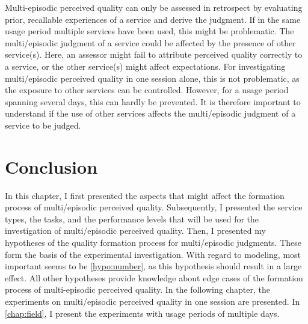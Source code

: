 Multi-episodic perceived quality can only be assessed in retrospect by evaluating prior, recallable experiences of a service and derive the judgment.
If in the same usage period multiple services have been used, this might be problematic.
The multi\-/episodic judgment of a service could be affected by the presence of other service(s).
Here, an assessor might fail to attribute perceived quality correctly to a service, or the other service(s) might affect expectations.
For investigating multi\-/episodic perceived quality in one session alone, this is not problematic, as the exposure to other services can be controlled.
However, for a usage period spanning several days, this can hardly be prevented.
It is therefore important to understand if the use of other services affects the multi\-/episodic judgment of a service to be judged.

\section{Conclusion}
In this chapter, I first presented the aspects that might affect the formation process of multi\-/episodic perceived quality.
Subsequently, I presented the service types, the tasks, and the performance levels that will be used for the investigation of multi\-/episodic perceived quality.
Then, I presented my hypotheses of the quality formation process for multi\-/episodic judgments.
These form the basis of the experimental investigation.
With regard to modeling, most important seems to be \autoref{hypo:number}, as this hypothesis should result in a large effect.
All other hypotheses provide knowledge about edge cases of the formation process of multi-episodic perceived quality.
In the following chapter, the experiments on multi\-/episodic perceived quality in one session are presented.
In \autoref{chap:field}, I present the experiments with usage periods of multiple days. 
